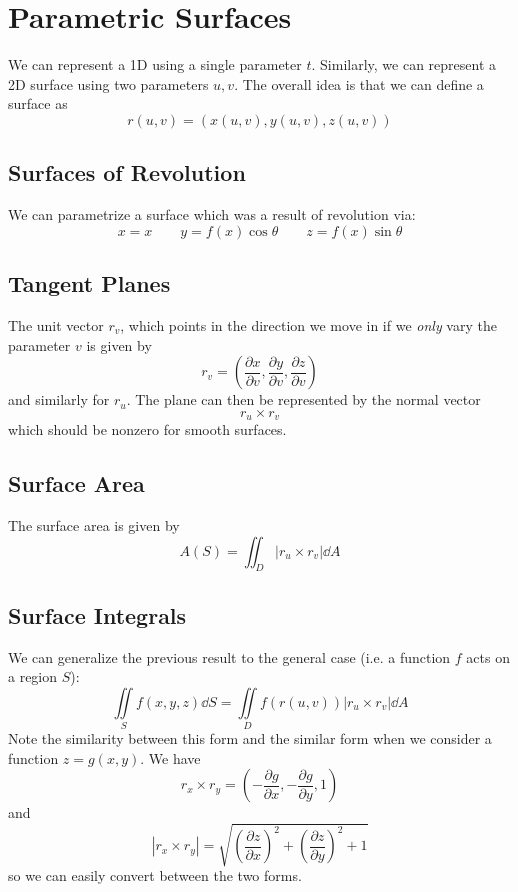 \documentclass{article}
\begin{document}
\section{Parametric Surfaces}
We can represent a 1D using a single parameter $t$. Similarly, we can represent a 2D surface using two parameters $u,v$. The overall idea is that we can define a surface as
\begin{equation}
    r(u,v) = (x(u,v), y(u,v), z(u,v))
\end{equation}
\subsection{Surfaces of Revolution}
We can parametrize a surface which was a result of revolution via: 
\begin{equation}
    x=x\quad\quad y=f(x)\cos\theta \quad\quad z=f(x)\sin\theta
\end{equation}
\subsection{Tangent Planes}
The unit vector $r_v$, which points in the direction we move in if we \textit{only} vary the parameter $v$ is given by
\begin{equation}
    r_v = \left(\frac{\partial x}{\partial v},\frac{\partial y}{\partial v},\frac{\partial z}{\partial v}\right)
\end{equation}
and similarly for $r_u$. The plane can then be represented by the normal vector 
\begin{equation}
    r_u \times r_v
\end{equation}
which should be nonzero for smooth surfaces.
\subsection{Surface Area}
The surface area is given by 
\begin{equation}
    A(S) = \iint_D |r_u \times r_v | \dd{A}
\end{equation}
\subsection{Surface Integrals}
We can generalize the previous result to the general case (i.e. a function $f$ acts on a region $S$): 
\begin{equation}
    \iint\limits_S f(x,y,z) \dd{S} = \iint\limits_D f(r(u,v)) |r_u \times r_v| \dd{A}
\end{equation}
Note the similarity between this form and the similar form when we consider a function $z=g(x,y)$. We have 
\begin{equation}
    r_x\times r_y = \left(-\frac{\partial g}{\partial x}, -\frac{\partial g}{\partial y}, 1\right)
\end{equation}
and
\begin{equation}
    |r_x\times r_y| = \sqrt{\left(\frac{\partial z}{\partial x}\right)^2+\left(\frac{\partial z}{\partial y}\right)^2+1}
\end{equation}
so we can easily convert between the two forms.
\end{document}
